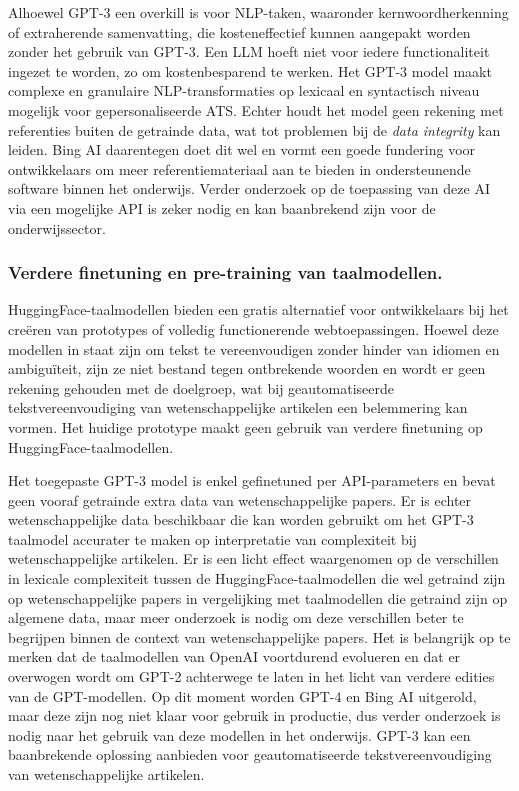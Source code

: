 Alhoewel GPT-3 een overkill is voor NLP-taken, waaronder kernwoordherkenning of extraherende samenvatting, die kosteneffectief kunnen aangepakt worden zonder het gebruik van GPT-3. Een LLM hoeft niet voor iedere functionaliteit ingezet te worden, zo om kostenbesparend te werken. Het GPT-3 model maakt complexe en granulaire NLP-transformaties op lexicaal en syntactisch niveau mogelijk voor gepersonaliseerde ATS. Echter houdt het model geen rekening met referenties buiten de getrainde data, wat tot problemen bij de \textit{data integrity} kan leiden. Bing AI daarentegen doet dit wel en vormt een goede fundering voor ontwikkelaars om meer referentiemateriaal aan te bieden in ondersteunende software binnen het onderwijs. Verder onderzoek op de toepassing van deze AI via een mogelijke API is zeker nodig en kan baanbrekend zijn voor de onderwijssector. 

\subsubsection{Verdere finetuning en pre-training van taalmodellen.}

HuggingFace-taalmodellen bieden een gratis alternatief voor ontwikkelaars bij het creëren van prototypes of volledig functionerende webtoepassingen. Hoewel deze modellen in staat zijn om tekst te vereenvoudigen zonder hinder van idiomen en ambiguïteit, zijn ze niet bestand tegen ontbrekende woorden en wordt er geen rekening gehouden met de doelgroep, wat bij geautomatiseerde tekstvereenvoudiging van wetenschappelijke artikelen een belemmering kan vormen. Het huidige prototype maakt geen gebruik van verdere finetuning op HuggingFace-taalmodellen.

\medspace

Het toegepaste GPT-3 model is enkel gefinetuned per API-parameters en bevat geen vooraf getrainde extra data van wetenschappelijke papers. Er is echter wetenschappelijke data beschikbaar die kan worden gebruikt om het GPT-3 taalmodel accurater te maken op interpretatie van complexiteit bij wetenschappelijke artikelen. Er is een licht effect waargenomen op de verschillen in lexicale complexiteit tussen de HuggingFace-taalmodellen die wel getraind zijn op wetenschappelijke papers in vergelijking met taalmodellen die getraind zijn op algemene data, maar meer onderzoek is nodig om deze verschillen beter te begrijpen binnen de context van wetenschappelijke papers. Het is belangrijk op te merken dat de taalmodellen van OpenAI voortdurend evolueren en dat er overwogen wordt om GPT-2 achterwege te laten in het licht van verdere edities van de GPT-modellen. Op dit moment worden GPT-4 en Bing AI uitgerold, maar deze zijn nog niet klaar voor gebruik in productie, dus verder onderzoek is nodig naar het gebruik van deze modellen in het onderwijs. GPT-3 kan een baanbrekende oplossing aanbieden voor geautomatiseerde tekstvereenvoudiging van wetenschappelijke artikelen.

